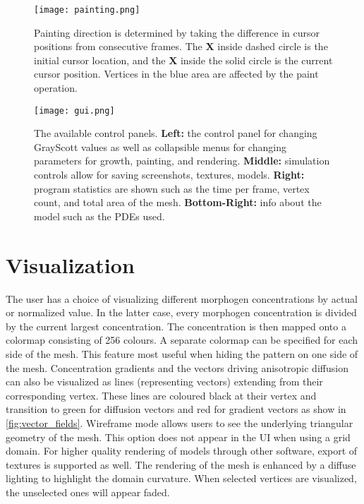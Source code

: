 \begin{figure}[ht]
	\centering
	\texttt{[image: painting.png]}	
	\caption{Painting direction is determined by taking the difference in cursor positions from consecutive frames. The \textbf{X} inside dashed circle is the initial cursor location, and the \textbf{X} inside the solid circle is the current cursor position. Vertices in the blue area are affected by the paint operation.} 
	\label{fig:painting}
\end{figure}

\begin{figure}[p]
	\centering
	\texttt{[image: gui.png]}	
	\caption{The available control panels. \textbf{Left:} the control panel for changing GrayScott values as well as collapsible menus for changing parameters for growth, painting, and rendering. \textbf{Middle:} simulation controls allow for saving screenshots, textures, models. \textbf{Right:} program statistics are shown such as the time per frame, vertex count, and total area of the mesh. \textbf{Bottom-Right:} info about the model such as the PDEs used.} 
	\label{fig:GUIexample}
\end{figure}


\section{Visualization}
The user has a choice of visualizing different morphogen concentrations by actual or normalized value. In the latter case, every morphogen concentration is divided by the current largest concentration. The concentration is then mapped onto a colormap consisting of 256 colours. A separate colormap can be specified for each side of the mesh. This feature most useful when hiding the pattern on one side of the mesh. Concentration gradients and the vectors driving anisotropic diffusion can also be visualized as lines (representing vectors) extending from their corresponding vertex. These lines are coloured black at their vertex and transition to green for diffusion vectors and red for gradient vectors as show in \ref{fig:vector_fields}. Wireframe mode allows users to see the underlying triangular geometry of the mesh. This option does not appear in the UI when using a grid domain. For higher quality rendering of models through other software, export of textures is supported as well. The rendering of the mesh is enhanced by a diffuse lighting to highlight the domain curvature. When selected vertices are visualized, the unselected ones will appear faded.

